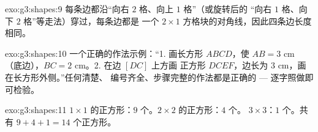 \begin{solution}{exo:g3:shapes:9}
每条边都沿“向右 $2$ 格、向上 $1$ 格”（或旋转后的
“向右 $1$ 格、向下 $2$ 格”等走法）穿过，每条边都是
一个 $2 \times 1$ 方格块的对角线，因此四条边长度相同。
\end{solution}

\begin{solution}{exo:g3:shapes:10}
一个正确的作法示例：“1. 画长方形 $ABCD$，使 $AB = 3$ cm
（底边），$BC = 2$ cm。2. 在边 $[DC]$ 上方画
正方形 $DCEF$，边长为 $3$ cm，画在长方形外侧。”任何清楚、
编号齐全、步骤完整的作法都是正确的 ---
逐字照做即可检验。
\end{solution}

\begin{solution}{exo:g3:shapes:11}
$1 \times 1$ 的正方形：$9$ 个。$2 \times 2$ 的正方形：$4$ 个。
$3 \times 3$：$1$ 个。共有 $9 + 4 + 1 = 14$ 个正方形。
\end{solution}
